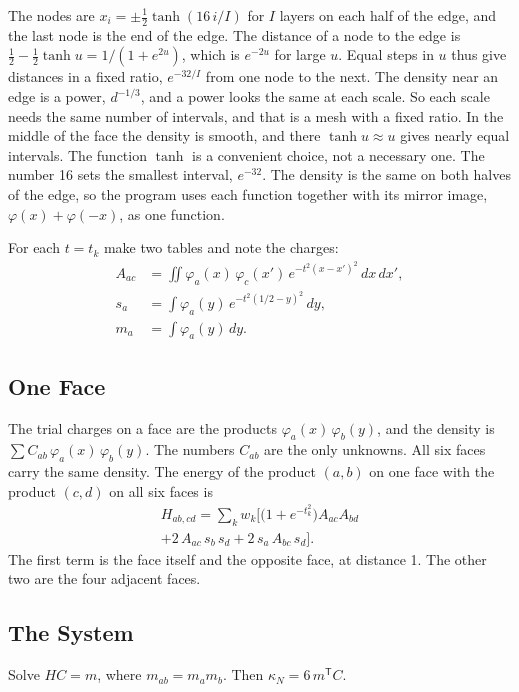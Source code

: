 \documentclass[journal]{IEEEtran}
\newcommand{\T}{\mathsf T}
\begin{document}
The nodes are $x_i = \pm\frac12 \tanh(16\, i/I)$ for $I$ layers on each half of the edge, and the last node is the end of the edge. The distance of a node to the edge is $\frac12 - \frac12\tanh u = 1/(1 + e^{2u})$, which is $e^{-2u}$ for large $u$. Equal steps in $u$ thus give distances in a fixed ratio, $e^{-32/I}$ from one node to the next. The density near an edge is a power, $d^{-1/3}$, and a power looks the same at each scale. So each scale needs the same number of intervals, and that is a mesh with a fixed ratio. In the middle of the face the density is smooth, and there $\tanh u \approx u$ gives nearly equal intervals. The function $\tanh$ is a convenient choice, not a necessary one. The number 16 sets the smallest interval, $e^{-32}$. The density is the same on both halves of the edge, so the program uses each function together with its mirror image, $\varphi(x) + \varphi(-x)$, as one function.

For each $t = t_k$ make two tables and note the charges:
\begin{align}
A_{ac} &= \iint \varphi_a(x)\, \varphi_c(x')\, e^{-t^2 (x-x')^2}\, dx\, dx', \\
s_a &= \int \varphi_a(y)\, e^{-t^2 (1/2-y)^2}\, dy, \\
m_a &= \int \varphi_a(y)\, dy .
\end{align}

\subsection{One Face}
The trial charges on a face are the products $\varphi_a(x)\,\varphi_b(y)$, and the density is $\sum C_{ab}\, \varphi_a(x)\, \varphi_b(y)$. The numbers $C_{ab}$ are the only unknowns. All six faces carry the same density. The energy of the product $(a,b)$ on one face with the product $(c,d)$ on all six faces is
\begin{multline}
H_{ab,cd} = \sum_k w_k \Big[ \big(1 + e^{-t_k^2}\big) A_{ac} A_{bd} \\
+ 2\, A_{ac}\, s_b\, s_d + 2\, s_a\, A_{bc}\, s_d \Big].
\label{eq:H}
\end{multline}
The first term is the face itself and the opposite face, at distance 1. The other two are the four adjacent faces.

\subsection{The System}
Solve $H C = m$, where $m_{ab} = m_a m_b$. Then $\kappa_N = 6\, m^{\T} C$.
\end{document}
